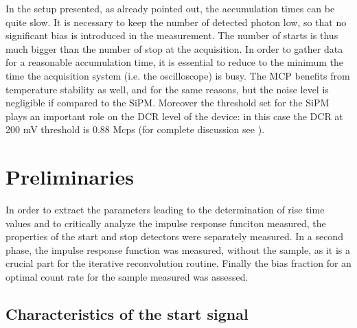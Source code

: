 In the setup presented, as already pointed out, the accumulation times can be quite slow. It is necessary to keep the number of detected photon low, so that no significant bias is introduced in the measurement. The number of starts is thus much bigger than the number of stop at the acquisition. In order to gather data for a reasonable accumulation time, it is essential to reduce to the minimum the time the acquisition system (i.e. the oscilloscope) is busy.
The MCP benefits from temperature stability as well, and for the same reasons, but the noise level is negligible if compared to the SiPM.
Moreover the threshold set for the SiPM plays an important role on the DCR level of the device: in this case the DCR at 200 mV threshold is 0.88 Mcps (for complete discussion see \cite{Gundacker2014}). 


\section{Preliminaries}

In order to extract the parameters leading to the determination of rise time values and to critically analyze the impulse response funciton measured, the properties of the start and stop detectors were separately measured. 
In a second phase, the impulse response function was measured, without the sample, as it is a crucial part for the iterative reconvolution routine.
Finally the bias fraction for an optimal count rate for the sample measured was assessed.

\subsection{Characteristics of the start signal}

